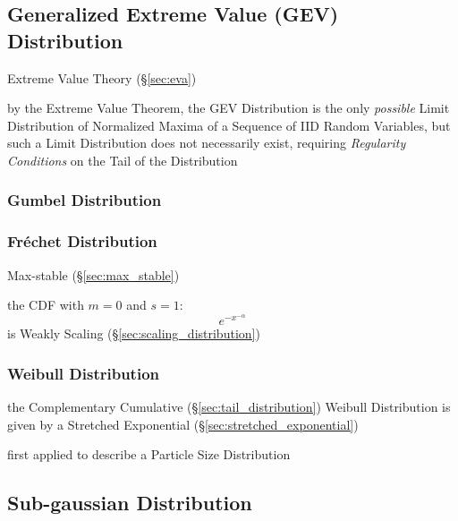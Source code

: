\subsection{Generalized Extreme Value (GEV) Distribution}\label{sec:gev}

Extreme Value Theory (\S\ref{sec:eva})

by the Extreme Value Theorem, the GEV Distribution is the only \emph{possible}
Limit Distribution of Normalized Maxima of a Sequence of IID Random Variables,
but such a Limit Distribution does not necessarily exist, requiring
\emph{Regularity Conditions} on the Tail of the Distribution



\subsubsection{Gumbel Distribution}\label{sec:gumbel_distribution}

\subsubsection{Fr\'echet Distribution}\label{sec:frechet_distribution}

Max-stable (\S\ref{sec:max_stable})

the CDF with $m = 0$ and $s = 1$:
\[
  e^{-x^{-\alpha}}
\]
is Weakly Scaling (\S\ref{sec:scaling_distribution})



\subsubsection{Weibull Distribution}\label{sec:weibull_distribution}

the Complementary Cumulative (\S\ref{sec:tail_distribution}) Weibull
Distribution is given by a Stretched Exponential
(\S\ref{sec:stretched_exponential})

first applied to describe a Particle Size Distribution



\subsection{Sub-gaussian Distribution}\label{sec:sub_gaussian}

